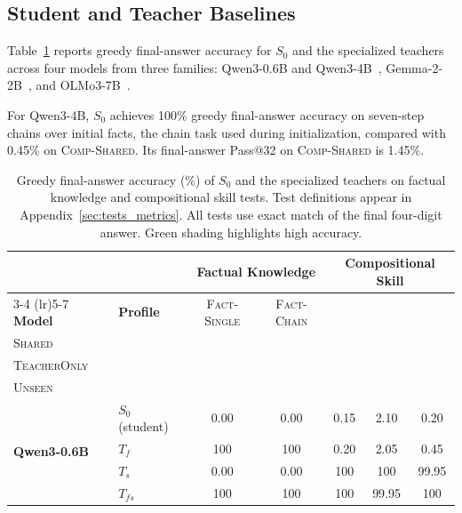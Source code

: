 \documentclass[]{template}
\providecommand{\hi}{\cellcolor{qgreen!18!white}}
\theoremstyle{plain}
\theoremstyle{definition}
\theoremstyle{remark}
\begin{document}
\subsection{Student and Teacher Baselines}
Table~\ref{tab:teacher_profiles_eval} reports greedy final-answer accuracy for $S_0$ and the specialized teachers across four models from three families: Qwen3-0.6B and Qwen3-4B~\citep{2025qwen3}, Gemma-2-2B~\citep{team2024gemma}, and OLMo3-7B~\citep{olmo2025olmo}.

For Qwen3-4B, $S_0$ achieves 100\% greedy final-answer accuracy on seven-step chains over initial facts, the chain task used during initialization, compared with 0.45\% on \textsc{Comp-Shared}. Its final-answer Pass@32 on \textsc{Comp-Shared} is 1.45\%.

\begin{table}[htbp]
  \centering
  \caption{Greedy final-answer accuracy (\%) of $S_0$ and the specialized teachers on factual knowledge and compositional skill tests. Test definitions appear in Appendix~\ref{sec:tests_metrics}. All tests use exact match of the final four-digit answer. Green shading highlights high accuracy.}
  \label{tab:teacher_profiles_eval}
  \footnotesize
  \setlength{\tabcolsep}{5pt}
  \renewcommand{\arraystretch}{1.1}
  \providecommand{\hi}{\cellcolor{qgreen!18!white}}   
  \providecommand{\md}{\cellcolor{qgreen!12!white}}   
  \providecommand{\lo}{\cellcolor{qgreen!8!white}}   
  \begin{tabular}{@{}llccccc@{}}
    \toprule
    & & \multicolumn{2}{c}{\textbf{Factual Knowledge}} & \multicolumn{3}{c}{\textbf{Compositional Skill}} \\
    \cmidrule(lr){3-4}
    \cmidrule(lr){5-7}
    \textbf{Model} & \textbf{Profile}
      & \textsc{Fact-Single} & \textsc{Fact-Chain}
      & \shortstack{\textsc{Comp-}\\\textsc{Shared}} & \shortstack{\textsc{Comp-}\\\textsc{TeacherOnly}} & \shortstack{\textsc{Comp-}\\\textsc{Unseen}} \\
    \midrule
    \multirow{4}{*}{\textbf{Qwen3-0.6B}}
     & $S_0$ (student) & 0.00 & 0.00 & 0.15 & 2.10 & 0.20 \\
     & $T_f$           & \hi 100 & \hi 100 & 0.20 & 2.05 & 0.45 \\
     & $T_s$           & 0.00 & 0.00 & \hi 100 & \hi 100 & \hi 99.95 \\
     & $T_{fs}$        & \hi 100 & \hi 100 & \hi 100 & \hi 99.95 & \hi 100 \\

\end{tabular}
\end{table}
\end{document}
